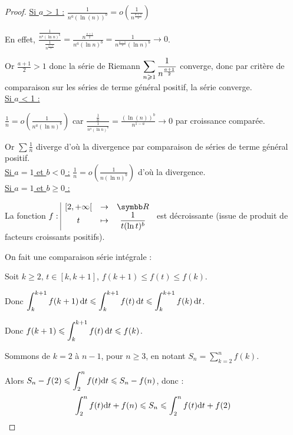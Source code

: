 \begin{proof}
    \uline{Si $a$ > 1 :}
    $\displaystyle \frac 1 {n^a(\ln(n))^b} = o \left( \frac 1 {n^{\frac{a + 1} 2}} \right)$

    En effet, $\displaystyle \frac{\frac 1 {n^a (\ln n)^b}}{\frac 1 {n^{\frac{a + 1} 2}}} = \frac{n^{\frac{a + 1} 2}}{n^a(\ln n)^b} = \frac{1}{n^{\frac{a - 1} 2}(\ln n)^b} \to 0$.

    Or $\frac{a + 1} 2 > 1$ donc la série de Riemann $\displaystyle \sum_{n \geqslant 1} \frac 1 {n^{\frac{a + 1} 2}}$ converge, donc par critère de comparaison
    sur les séries de terme général positif, la série converge. \\ 

    \uline{Si $a$ < 1 :}

    \svspace $\displaystyle \frac 1 n = o \left( \frac{1 }{n^a (\ln n)^b} \right)$
     car $\displaystyle \frac{\frac 1 n}{\frac 1 {n^a (\ln n)^b}} = \frac{(\ln(n))^b }{n^{1 - a}} \to 0$ par croissance comparée.

     Or $\sum \frac 1 n $ diverge d'où la divergence par comparaison de séries de terme général positif. \\

    \uline{Si $a = 1$ et $b < 0$ :}
    $\frac 1 n = o \left( \frac 1 {n (\ln n)^b} \right)$ d'où la divergence. \\ 

    \uline{Si $a = 1$ et $b \geqslant 0$ :}

    \svspace La fonction $\fonction f {[2, + \infty[} \R t {\frac 1 {t (\ln t)^b}}$ est décroissante (issue de produit
    de facteurs croissants positifs). 

    On fait une comparaison série intégrale : 

    Soit $k \geqslant 2, \, t \in [k, k + 1]$, $f(k + 1) \leqslant f(t) \leqslant f(k)$.

    Donc $\displaystyle \int_{k}^{k + 1} f(k + 1) \,\mathrm{d}t \leqslant \int_{k}^{k + 1} f(t) \,\mathrm{d}t \leqslant \int_{k}^{k + 1} f(k) \,\mathrm{d}t$.

    Donc $\displaystyle f(k + 1) \leqslant \int_{k}^{k + 1} f(t) \,\mathrm{d}t \leqslant f(k)$.

    Sommons de $k = 2$ à $n - 1$, pour $n \geqslant 3$, en notant $\displaystyle S_n = \sum_{k = 2}^{n} f(k)$. 

    Alors $\displaystyle S_n - f(2) \leqslant \int_{2}^{n} f(t) \text d t \leqslant S_n - f(n)$, donc :
    \[\int_{2}^{n} f(t) \text d t + f(n) \leqslant S_n \leqslant \int_{2}^{n} f(t) \text d t + f(2)\]


\end{proof}
